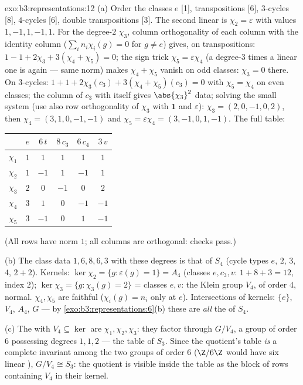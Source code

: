 \begin{solution}{exo:b3:representations:12}
(a) Order the classes $e$ [1], transpositions [6],
$3$-cycles [8], $4$-cycles [6], double transpositions [3].
The second linear  is $\chi_2 = \varepsilon$ with
values $1, -1, 1, -1, 1$. For the degree-$2$ 
$\chi_3$, column orthogonality of each column with the
identity column ($\sum_in_i\chi_i(g) = 0$ for $g \neq e$)
gives, on transpositions: $1 - 1 + 2\chi_3 + 3(\chi_4 +
\chi_5) = 0$; the sign trick $\chi_5 = \varepsilon\chi_4$
(a degree-$3$  times a linear one is again
 --- same norm) makes $\chi_4 + \chi_5$ vanish on
odd classes: $\chi_3 = 0$ there. On $3$-cycles: $1 + 1 +
2\chi_3(c_3) + 3(\chi_4 + \chi_5)(c_3) = 0$ with
$\chi_5 = \chi_4$ on even classes; the column of $c_3$ with
itself gives $\abs{\chi_3}^2$ data; solving the small system
(use also row orthogonality of $\chi_3$ with $\mathbf 1$ and
$\varepsilon$): $\chi_3 = (2, 0, -1, 0, 2)$, then $\chi_4 =
(3, 1, 0, -1, -1)$ and $\chi_5 = \varepsilon\chi_4 = (3, -1,
0, 1, -1)$. The full table:
\begin{center}
\begin{tabular}{c|ccccc}
 & $e$ & $6\,t$ & $8\,c_3$ & $6\,c_4$ & $3\,v$\\
\hline
$\chi_1$ & $1$ & $1$ & $1$ & $1$ & $1$\\
$\chi_2$ & $1$ & $-1$ & $1$ & $-1$ & $1$\\
$\chi_3$ & $2$ & $0$ & $-1$ & $0$ & $2$\\
$\chi_4$ & $3$ & $1$ & $0$ & $-1$ & $-1$\\
$\chi_5$ & $3$ & $-1$ & $0$ & $1$ & $-1$\\
\end{tabular}
\end{center}
(All rows have norm $1$; all columns are orthogonal:
checks pass.)

(b) The class data $1, 6, 8, 6, 3$ with these degrees is that
of $S_4$ (cycle types $e$, $2$, $3$, $4$, $2{+}2$).
Kernels: $\ker\chi_2 = \{g : \varepsilon(g) = 1\} = A_4$
(classes $e, c_3, v$: $1 + 8 + 3 = 12$, index $2$);
$\ker\chi_3 = \{g : \chi_3(g) = 2\}$ = classes $e, v$: the
Klein group $V_4$, of order $4$, normal. $\chi_4, \chi_5$
are faithful ($\chi_i(g) = n_i$ only at $e$). Intersections
of kernels: $\{e\}$, $V_4$, $A_4$, $G$ --- by
\cref{exo:b3:representations:6}(b) these are \emph{all} the
 of $S_4$.

(c) The  with $V_4 \subseteq \ker$ are $\chi_1,
\chi_2, \chi_3$: they factor through $G/V_4$, a group of
order $6$ possessing  degrees $1, 1, 2$ --- the
table of $S_3$. Since the quotient's table \emph{is} a
complete invariant among the two groups of order $6$
($\Z/6\Z$ would have six linear ), $G/V_4 \cong
S_3$: the quotient is visible inside the table as the block
of rows containing $V_4$ in their kernel.
\end{solution}

